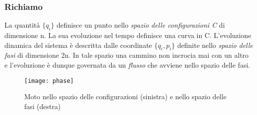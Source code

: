 \subsubsection{Richiamo}
La quantit\`{a} $\{q_i \}$ definisce un punto nello \textit{spazio delle configurazioni C} di dimensione n. La sua evoluzione nel tempo definisce una curva in C. L'evoluzione dinamica del sistema \`{e} descritta dalle coordinate $\{q_i,p_i \}$ definite nello \textit{spazio delle fasi} di dimensione 2n. In tale spazio una cammino non incrocia mai con un altro e l'evoluzione \`{e} dunque governata da un \textit{flusso} che avviene nello spazio delle fasi.

 
\begin{figure}[ht]
\vspace{0.1in}
\texttt{[image: phase]}	
\centering
\vspace{0.1in}
\caption{Moto nello spazio delle configurazioni (sinistra) e nello spazio delle fasi (destra)}
\end{figure}


